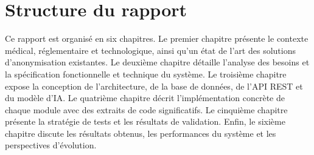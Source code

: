 \section*{Structure du rapport}

Ce rapport est organisé en six chapitres. Le premier chapitre présente le contexte médical, réglementaire et technologique, ainsi qu'un état de l'art des solutions d'anonymisation existantes. Le deuxième chapitre détaille l'analyse des besoins et la spécification fonctionnelle et technique du système. Le troisième chapitre expose la conception de l'architecture, de la base de données, de l'API REST et du modèle d'IA. Le quatrième chapitre décrit l'implémentation concrète de chaque module avec des extraits de code significatifs. Le cinquième chapitre présente la stratégie de tests et les résultats de validation. Enfin, le sixième chapitre discute les résultats obtenus, les performances du système et les perspectives d'évolution.
